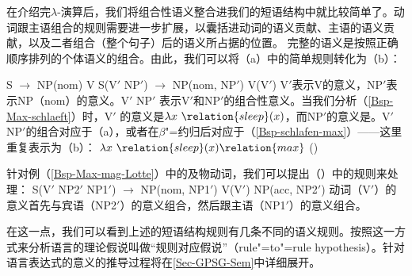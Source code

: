 \begin{sloppypar}
\noindent
在介绍完$\lambda$-演算后，我们将组合性语义整合进我们的短语结构中就比较简单了。动词跟主语组合的规则需要进一步扩展，以囊括进动词的语义贡献、主语的语义贡献，以及二者组合（整个句子）后的语义所占据的位置。
  完整的语义是按照正确顺序排列的个体语义的组合。由此，我们可以将（a）中的简单规则转化为（b）：
\end{sloppypar}
\eal
\ex S $\to$ NP(nom) V
\ex S(V$'$ NP$'$) $\to$ NP(nom, NP$'$) V(V$'$)
\zl
V$'$表示V的意义，NP$'$表示NP（nom）的意义。V$'$ NP$'$ 表示V$'$和NP$'$的组合性意义。当我们分析（\ref{Bsp-Max-schlaeft}）时，V$'$ 的意义是$\lambda x~\relation{sleep}(x)$，而NP$'$的意义是。V$'$ NP$'$的组合对应于（a），或者在$\beta$"=约归后对应于（\ref{Bsp-schlafen-max}）——这里重复表示为（b）：
\eal
\ex $\lambda x~\relation{sleep}(x) \relation{max}$
\ex {}()
\zl

\noindent
针对例（\ref{Bsp-Max-mag-Lotte}）中的及物动词，我们可以提出（）中的规则来处理：
\ea
S(V$'$ NP2$'$ NP1$'$) $\to$ NP(nom, NP1$'$) V(V$'$) NP(acc, NP2$'$)
\z
动词（V$'$）的意义首先与宾语（NP2$'$）的意义组合，然后跟主语（NP1$'$）的意义组合。

在这一点，我们可以看到上述的短语结构规则有几条不同的语义规则。按照这一方式来分析语言的理论假说叫做“规则对应假说”（rule"=to"=rule hypothesis）\citep[]{Bach76a}。针对语言表达式的意义的推导过程将在\ref{Sec-GPSG-Sem}中详细展开。

